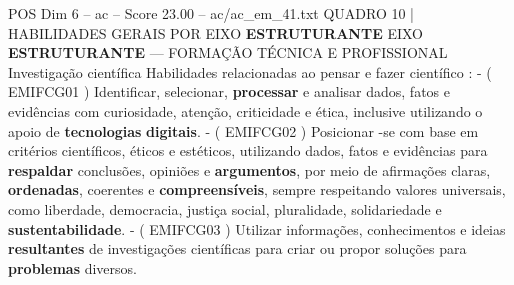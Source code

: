 \begin{textsample}{POS Dim 6 – ac – Score 23.00 – ac/ac\_em\_41.txt}
QUADRO 10 | HABILIDADES GERAIS POR EIXO \textbf{ESTRUTURANTE} EIXO \textbf{ESTRUTURANTE} — FORMAÇÃO TÉCNICA E PROFISSIONAL Investigação científica Habilidades relacionadas ao pensar e fazer científico : - ( EMIFCG01 ) Identificar, selecionar, \textbf{processar} e analisar dados, fatos e evidências com curiosidade, atenção, criticidade e ética, inclusive utilizando o apoio de \textbf{tecnologias} \textbf{digitais}. - ( EMIFCG02 ) Posicionar -se com base em critérios científicos, éticos e estéticos, utilizando dados, fatos e evidências para \textbf{respaldar} conclusões, opiniões e \textbf{argumentos}, por meio de afirmações claras, \textbf{ordenadas}, coerentes e \textbf{compreensíveis}, sempre respeitando valores universais, como liberdade, democracia, justiça social, pluralidade, solidariedade e \textbf{sustentabilidade}. - ( EMIFCG03 ) Utilizar informações, conhecimentos e ideias \textbf{resultantes} de investigações científicas para criar ou propor soluções para \textbf{problemas} diversos.

\end{textsample}
